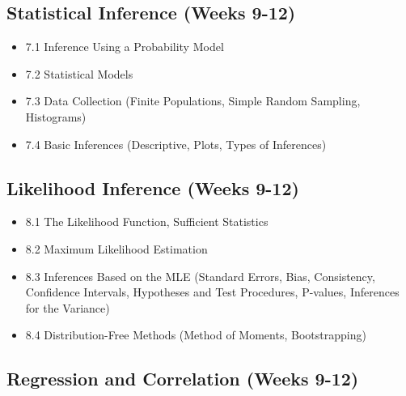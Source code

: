 \documentclass[]{book}
\providecommand{\tightlist}{%
  \setlength{\itemsep}{0pt}\setlength{\parskip}{0pt}}
\providecommand{\tightlist}{%
  \setlength{\itemsep}{0pt}\setlength{\parskip}{0pt}}
\theoremstyle{definition}
\theoremstyle{definition}
\theoremstyle{definition}
\theoremstyle{remark}
\begin{document}
\subsection*{Statistical Inference (Weeks
9-12)}\label{statistical-inference-weeks-9-12}

\begin{itemize}
\tightlist
\item
  7.1 Inference Using a Probability Model\\
\item
  7.2 Statistical Models\\
\item
  7.3 Data Collection (Finite Populations, Simple Random Sampling,
  Histograms)\\
\item
  7.4 Basic Inferences (Descriptive, Plots, Types of Inferences)
\end{itemize}

\subsection*{Likelihood Inference (Weeks
9-12)}\label{likelihood-inference-weeks-9-12}

\begin{itemize}
\tightlist
\item
  8.1 The Likelihood Function, Sufficient Statistics\\
\item
  8.2 Maximum Likelihood Estimation\\
\item
  8.3 Inferences Based on the MLE (Standard Errors, Bias, Consistency,
  Confidence Intervals, Hypotheses and Test Procedures, P-values,
  Inferences for the Variance)\\
\item
  8.4 Distribution-Free Methods (Method of Moments, Bootstrapping)
\end{itemize}

\subsection*{Regression and Correlation (Weeks
9-12)}\label{regression-and-correlation-weeks-9-12}
\end{document}

